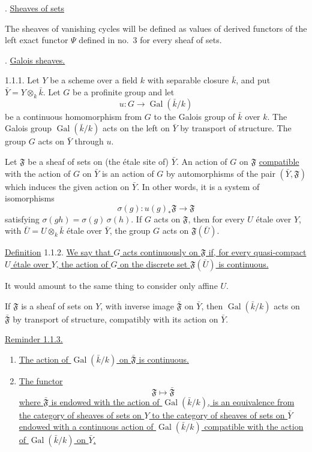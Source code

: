 
. \underline{Sheaves of sets}

The sheaves of vanishing cycles will be defined as values of derived
functors of the left exact functor $\Psi$ defined in no.~3 for every
sheaf of sets.

. \underline{Galois sheaves.}

1.1.1. Let $Y$ be a scheme over a field $k$ with separable closure
$\bar{k}$, and put $\bar{Y}=Y\otimes_k\bar{k}$.  Let $G$ be a profinite
group and let
\begin{equation*}
u:G\longrightarrow\operatorname{Gal}(\bar{k}/k)
\end{equation*}
be a continuous homomorphism from $G$ to the Galois group of $\bar{k}$
over $k$.  The Galois group $\operatorname{Gal}(\bar{k}/k)$ acts on the
left on $\bar{Y}$ by transport of structure.  The group $G$ acts on
$\bar{Y}$ through $u$.

Let $\mathfrak F$ be a sheaf of sets on (the \'{e}tale site of) $\bar Y$.
An action of $G$ on $\mathfrak F$ \underline{compatible} with the action
of $G$ on $\bar Y$ is an action of $G$ by automorphisms of the pair
$(\bar Y,\mathfrak F)$ which induces the given action on $\bar Y$.  In
other words, it is a system of isomorphisms
\begin{equation*}
\sigma(g):u(g)_*\mathfrak F\longrightarrow\mathfrak F
\end{equation*}
satisfying $\sigma(gh)=\sigma(g)\,\sigma(h)$.  If $G$ acts on
$\mathfrak F$, then for every $U$ \'{e}tale over $Y$, with
$\bar U=U\otimes_k\bar k$ \'{e}tale over $\bar Y$, the group $G$ acts on
$\mathfrak F(\bar U)$.

\underline{Definition} 1.1.2. \underline{We say that $G$ acts
continuously on $\mathfrak F$ if, for every quasi-compact $U$ \'{e}tale
over $Y$, the action of $G$ on the discrete set $\mathfrak F(\bar U)$ is
continuous.}

It would amount to the same thing to consider only affine $U$.

If $\mathfrak F$ is a sheaf of sets on $Y$, with inverse image
$\bar{\mathfrak F}$ on $\bar Y$, then
$\operatorname{Gal}(\bar k/k)$ acts on $\bar{\mathfrak F}$ by transport
of structure, compatibly with its action on $\bar Y$.

\underline{Reminder 1.1.3.}
\begin{enumerate}[label=(\roman*),leftmargin=2.7em]
\item \underline{The action of $\operatorname{Gal}(\bar k/k)$ on
$\bar{\mathfrak F}$ is continuous.}


\item \underline{The functor}
\begin{equation*}
\mathfrak F\longmapsto\bar{\mathfrak F}
\end{equation*}
\underline{where $\bar{\mathfrak F}$ is endowed with the action of
$\operatorname{Gal}(\bar k/k)$, is an equivalence from the category of sheaves of sets on
$Y$ to the category of sheaves of sets on $\bar Y$ endowed with a
continuous action of $\operatorname{Gal}(\bar k/k)$ compatible with the
action of $\operatorname{Gal}(\bar k/k)$ on $\bar Y$.}
\end{enumerate}

